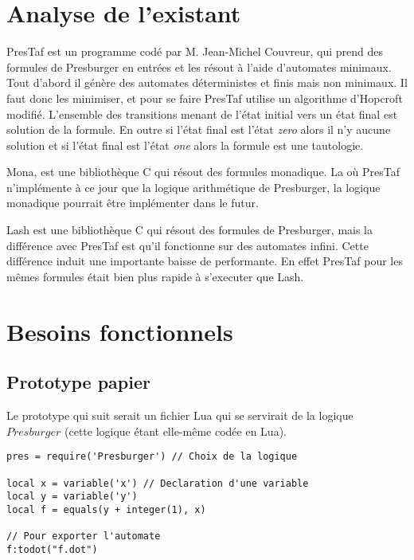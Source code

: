 \documentclass{article}%
\begin{document}
\section{Analyse de l'existant}

PresTaf est un programme codé par M. Jean-Michel Couvreur, qui prend des formules de Presburger en entrées et les résout à l'aide d'automates minimaux. Tout d'abord il génère des automates déterministes et finis mais non minimaux. Il faut donc les minimiser, et pour se faire PresTaf utilise un algorithme d'Hopcroft modifié. L'ensemble des transitions menant de l'état initial vers un état final est solution de la formule. En outre si l'état final est l'état \emph{zero} alors il n'y aucune solution et si l'état final est l'état \emph{one} alors la formule est une tautologie.\\\par

Mona, est une bibliothèque C qui résout des formules monadique. La où PresTaf n'implémente à ce jour que la logique arithmétique de Presburger, la logique monadique pourrait être implémenter dans le futur.\\\par

Lash\cite{lash} est une bibliothèque C qui résout des formules de Presburger, mais la différence avec PresTaf est qu'il fonctionne sur des automates infini. Cette différence induit une importante baisse de performante. En effet PresTaf pour les mêmes formules était bien plus rapide à s'executer que Lash\cite{DBLP:conf/wia/Couvreur04}.\\\par

\section{Besoins fonctionnels}

\subsection{Prototype papier}

Le prototype qui suit serait un fichier Lua qui se servirait de la logique $Presburger$ (cette logique étant elle-même codée en Lua).

\begin{lstlisting}[mathescape=true, frame=single]
pres = require('Presburger') // Choix de la logique

local x = variable('x') // Declaration d'une variable
local y = variable('y')
local f = equals(y + integer(1), x)

// Pour exporter l'automate
f:todot("f.dot")
\end{lstlisting}
\end{document}
